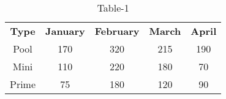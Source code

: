 \begin{table}[htbp]
\centering
  \caption{Table-1}
  \label{tabl:tables/table1.tex}
  \begin{tabular}{c|cccc}
\textbf{Type} & \textbf{January} & \textbf{February} & \textbf{March} & \textbf{April} \\
Pool & 170 & 320 & 215 & 190 \\
Mini & 110 & 220 & 180 & 70 \\
Prime & 75 & 180 & 120 & 90 \\
  \end{tabular}
\end{table}

